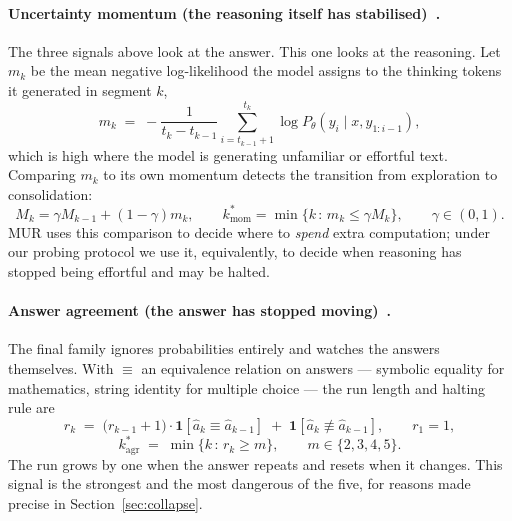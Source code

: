 \documentclass[acmsmall]{acmart}
\theoremstyle{acmdefinition}%
\theoremstyle{acmplain}}{}%
\begin{document}
\paragraph{Uncertainty momentum (the reasoning itself has stabilised)~\cite{yan2025mur}.}
The three signals above look at the answer. This one looks at the reasoning. Let $m_k$ be the mean negative log-likelihood the model assigns to the thinking tokens it generated in segment $k$,
\begin{equation}
m_k \;=\; -\frac{1}{t_k - t_{k-1}} \sum_{i=t_{k-1}+1}^{t_k} \log P_\theta\!\left(y_i \mid x, y_{1:i-1}\right),
\label{eq:nll}
\end{equation}
which is high where the model is generating unfamiliar or effortful text. Comparing $m_k$ to its own momentum detects the transition from exploration to consolidation:
\begin{equation}
M_k = \gamma M_{k-1} + (1-\gamma) m_k, \qquad
k^\ast_{\mathrm{mom}} = \min\{k \,:\, m_k \leq \gamma M_k\}, \qquad \gamma \in (0,1).
\label{eq:momentum}
\end{equation}
MUR uses this comparison to decide where to \emph{spend} extra computation; under our probing protocol we use it, equivalently, to decide when reasoning has stopped being effortful and may be halted.

\paragraph{Answer agreement (the answer has stopped moving)~\cite{fu2024certaindex}.}
The final family ignores probabilities entirely and watches the answers themselves. With $\equiv$ an equivalence relation on answers --- symbolic equality for mathematics, string identity for multiple choice --- the run length and halting rule are
\begin{equation}
r_k \;=\; \big(r_{k-1} + 1\big)\cdot \mathbf{1}\!\left[\hat a_k \equiv \hat a_{k-1}\right] \;+\; \mathbf{1}\!\left[\hat a_k \not\equiv \hat a_{k-1}\right], \qquad r_1 = 1,
\label{eq:runlen}
\end{equation}
\begin{equation}
k^\ast_{\mathrm{agr}} \;=\; \min\{k \,:\, r_k \geq m\}, \qquad m \in \{2,3,4,5\}.
\label{eq:agree}
\end{equation}
The run grows by one when the answer repeats and resets when it changes. This signal is the strongest and the most dangerous of the five, for reasons made precise in Section~\ref{sec:collapse}.
\end{document}
